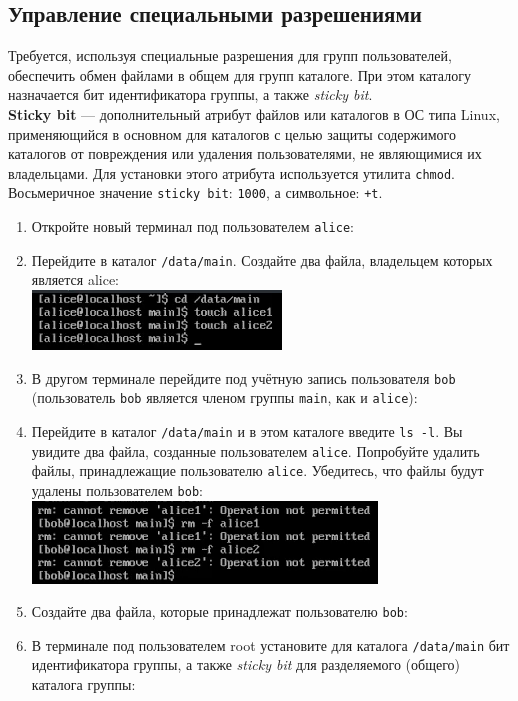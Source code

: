 \documentclass[12pt]{article}
\begin{document}
\subsection{Управление специальными разрешениями}
Требуется, используя специальные разрешения для групп пользователей, обеспечить обмен файлами в общем для групп каталоге. При этом каталогу назначается бит идентификатора группы, а также \textit{sticky bit}.\\
\textbf{Sticky bit} — дополнительный атрибут файлов или каталогов в ОС типа Linux, применяющийся в основном для каталогов с целью защиты содержимого каталогов от повреждения или удаления пользователями, не являющимися их владельцами. Для установки этого атрибута используется утилита \texttt{chmod}. Восьмеричное значение \texttt{sticky bit}: \texttt{1000}, а символьное: \texttt{+t}.
\begin{enumerate}
	\item Откройте новый терминал под пользователем \texttt{alice}:
	\item Перейдите в каталог \texttt{/data/main}. Создайте два файла, владельцем которых является alice:
	      \\\includegraphics{4.png}
	\item В другом терминале перейдите под учётную запись пользователя \texttt{bob} (пользователь \texttt{bob} является членом группы \texttt{main}, как и \texttt{alice}):
	\item Перейдите в каталог \texttt{/data/main} и в этом каталоге введите \texttt{ls -l}. Вы увидите два файла, созданные пользователем \texttt{alice}. Попробуйте удалить файлы, принадлежащие пользователю \texttt{alice}. Убедитесь, что файлы будут удалены пользователем \texttt{bob}:
	      \\\includegraphics{5.png}
	\item Создайте два файла, которые принадлежат пользователю \texttt{bob}:
	\item В терминале под пользователем root установите для каталога \texttt{/data/main} бит идентификатора группы, а также \textit{sticky bit} для разделяемого (общего) каталога группы:

\end{enumerate}
\end{document}
